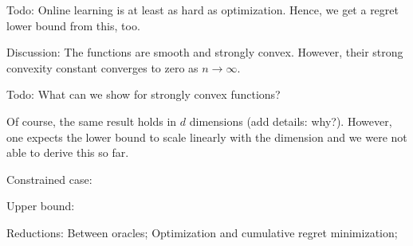 




Todo: Online learning is at least as hard as optimization. Hence, we get a regret lower bound from this, too.

Discussion: The functions are smooth and strongly convex.
However, their strong convexity constant converges to zero as $n\to\infty$.

Todo: What can we show for strongly convex functions?

Of course, the same result holds in $d$ dimensions (add details: why?). However, one expects the lower bound to scale linearly with the dimension and we were not able to derive this so far.

Constrained case:

Upper bound: 

Reductions:
Between oracles;
Optimization and cumulative regret minimization;


